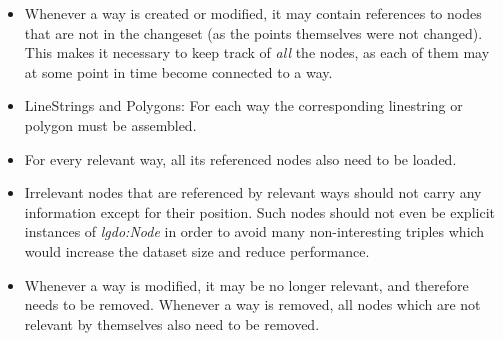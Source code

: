 \begin{itemize} 
  \item Whenever a way is created or modified, it may contain references to
  nodes that are not in the changeset (as the points themselves were not
  changed). This makes it necessary to keep track of \emph{all} the nodes, as
  each of them may at some point in time become connected to a way.
  \item LineStrings and Polygons: For each way the corresponding linestring or
  polygon must be assembled.
  \item For every relevant way, all its referenced nodes also need to be loaded.
  \item Irrelevant nodes that are referenced by relevant ways should not carry 
  any information except for their position. Such nodes should not even be
  explicit instances of \emph{lgdo:Node} in order to avoid many non-interesting
  triples which would increase the dataset size and reduce performance. 
  \item Whenever a way is modified, it may
  be no longer relevant, and therefore needs to be removed.
  Whenever a way is removed, all nodes which are not relevant by
  themselves also need to be removed.
\end{itemize}





